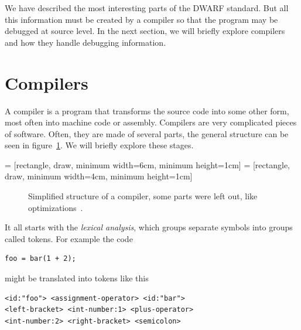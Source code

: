 We have described the most interesting parts of the DWARF standard. But all
this information must be created by a compiler so that the program
may be debugged at source level. In the next section, we will briefly explore
compilers and how they handle debugging information.

\section{Compilers}
A compiler is a program that transforms the source code into some other form,
most often into machine code or assembly. Compilers are very complicated pieces
of software. Often, they are made of several parts, the general structure can
be seen in figure~\ref{fig:compiler-structure}. We will briefly explore these
stages.

 = [rectangle, draw, minimum width=6cm, minimum height=1cm] 
 = [rectangle, draw, minimum width=4cm, minimum height=1cm] 
\begin{figure}
    {\centering
    \par}
    \caption{Simplified structure of a compiler, some parts were left out, like
    optimizations~\cite{dragon-book}.}
    \label{fig:compiler-structure}
\end{figure}

It all starts with the \textit{lexical analysis}, which groups separate symbols
into groups called tokens. For example the code
\begin{verbatim}
foo = bar(1 + 2);
\end{verbatim}
might be translated into tokens like this
\begin{lstlisting}[stringstyle=\color{black}]
<id:"foo"> <assignment-operator> <id:"bar"> 
<left-bracket> <int-number:1> <plus-operator> 
<int-number:2> <right-bracket> <semicolon>
\end{lstlisting}

